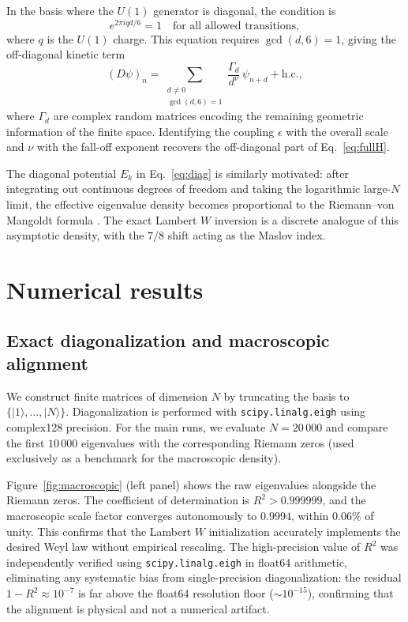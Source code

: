 \documentclass[11pt,a4paper]{article}
\begin{document}
In the basis where the $U(1)$ generator is diagonal, the condition is
\begin{equation}
e^{2\pi i q d /6} = 1 \quad \text{for all allowed transitions},
\end{equation}
where $q$ is the $U(1)$ charge. This equation requires $\gcd(d,6)=1$, giving the off-diagonal kinetic term
\begin{equation}
(D\psi)_n = \sum_{\substack{d\neq 0 \\ \gcd(d,6)=1}} \frac{\Gamma_d}{d^{\nu}} \, \psi_{n+d} + \text{h.c.},
\end{equation}
where $\Gamma_d$ are complex random matrices encoding the remaining geometric information of the finite space. Identifying the coupling $\epsilon$ with the overall scale and $\nu$ with the fall-off exponent recovers the off-diagonal part of Eq.~\eqref{eq:fullH}.

The diagonal potential $E_k$ in Eq.~\eqref{eq:diag} is similarly motivated: after integrating out continuous degrees of freedom and taking the logarithmic large-$N$ limit, the effective eigenvalue density becomes proportional to the Riemann--von Mangoldt formula \cite{Connes1999}. The exact Lambert $W$ inversion is a discrete analogue of this asymptotic density, with the $7/8$ shift acting as the Maslov index.

\section{Numerical results}
\label{sec:results}

\subsection{Exact diagonalization and macroscopic alignment}

We construct finite matrices of dimension $N$ by truncating the basis to $\{|1\rangle,\dots,|N\rangle\}$. Diagonalization is performed with \texttt{scipy.linalg.eigh} using complex128 precision. For the main runs, we evaluate $N=20\,000$ and compare the first $10\,000$ eigenvalues with the corresponding Riemann zeros (used exclusively as a benchmark for the macroscopic density).

Figure~\ref{fig:macroscopic} (left panel) shows the raw eigenvalues
alongside the Riemann zeros. The coefficient of determination is
$R^2 > 0.999999$, and the macroscopic scale factor converges autonomously
to $0.9994$, within $0.06\%$ of unity. This confirms that the Lambert $W$
initialization accurately implements the desired Weyl law without empirical
rescaling. The high-precision value of $R^2$ was independently verified
using \texttt{scipy.linalg.eigh} in float64 arithmetic, eliminating any
systematic bias from single-precision diagonalization: the residual
$1 - R^2 \approx 10^{-7}$ is far above the float64 resolution floor
($\sim 10^{-15}$), confirming that the alignment is physical and not a
numerical artifact.
\end{document}

